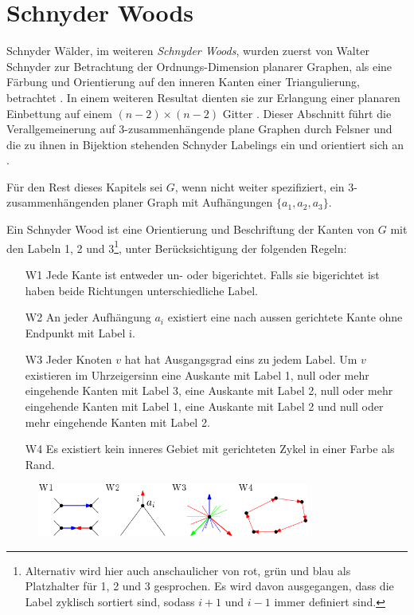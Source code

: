 \section{Schnyder Woods}\label{sw}
Schnyder Wälder, im weiteren \textit{Schnyder Woods}, wurden zuerst von Walter Schnyder zur Betrachtung der Ordnungs-Dimension planarer Graphen, als eine Färbung und Orientierung auf den inneren Kanten einer Triangulierung, betrachtet \cite{schnyder89}. In einem weiteren Resultat dienten sie zur Erlangung einer planaren Einbettung auf einem $(n-2)\times(n-2)$ Gitter \cite{schnyder90}. Dieser Abschnitt führt die Verallgemeinerung auf 3-zusammenhängende plane Graphen durch Felsner \cite{felsner01} und die zu ihnen in Bijektion stehenden Schnyder Labelings ein und orientiert sich an \cite{felsner04}.\

Für den Rest dieses Kapitels sei $G$, wenn nicht weiter spezifiziert, ein 3-zusammenhängenden planer Graph mit Aufhängungen $\{a_1,a_2,a_3\}$.

\begin{definition}\label{def_sw}
Ein Schnyder Wood ist eine Orientierung und Beschriftung der Kanten von $G$ mit den Labeln 1, 2 und 3\footnote{Alternativ wird hier auch anschaulicher von rot, grün und blau als Platzhalter für 1, 2 und 3 gesprochen. Es wird davon ausgegangen, dass die Label zyklisch sortiert sind, sodass $i+1$ und $i-1$ immer definiert sind.}, unter Berücksichtigung der folgenden Regeln:
\begin{itemize}
\item[W1] Jede Kante ist entweder un- oder bigerichtet. Falls sie bigerichtet ist haben beide Richtungen unterschiedliche Label.
\item[W2] An jeder Aufhängung  $a_i$ existiert eine nach aussen gerichtete Kante ohne Endpunkt mit Label i.  
\item[W3] Jeder Knoten $v$ hat hat Ausgangsgrad eins zu jedem Label. Um $v$ existieren im Uhrzeigersinn eine Auskante mit Label 1, null oder mehr eingehende Kanten mit Label 3, eine Auskante mit Label 2, null oder mehr  eingehende Kanten mit Label 1, eine Auskante mit Label 2 und null oder mehr  eingehende Kanten mit Label 2.
\item[W4] Es existiert kein inneres Gebiet mit gerichteten Zykel in einer Farbe als Rand.
\end{itemize}
\end{definition}

\begin{figure}[h]
	\centering
  \includegraphics[width=0.8\textwidth]{schnyder_wood_def.png}
\end{figure}

